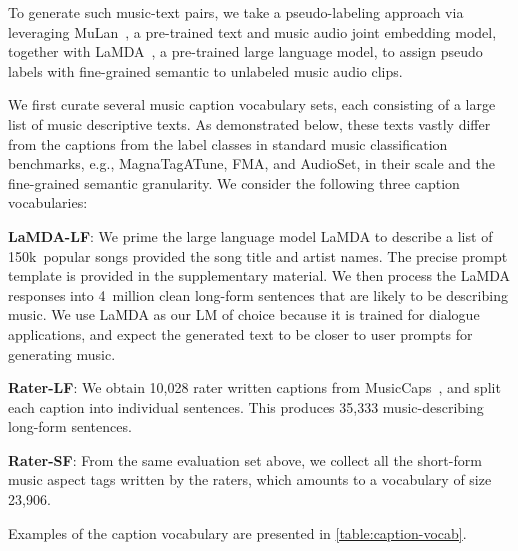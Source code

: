\documentclass[nohyperref]{article}
\newcommand{\EvalSet}{MusicCaps~\cite{musiclm2023}}
\theoremstyle{plain}
\theoremstyle{definition}
\theoremstyle{remark}
\begin{document}
To generate such music-text pairs, we take a pseudo-labeling approach via leveraging MuLan~\cite{mulan2022}, a pre-trained text and music audio joint embedding model, together with LaMDA~\cite{thoppilan2022lamda}, a pre-trained large language model, to assign pseudo labels with fine-grained semantic to unlabeled music audio clips.

We first curate several music caption vocabulary sets, each consisting of a large list of music descriptive texts. As demonstrated below, these texts vastly differ from the captions from the label classes in standard music classification benchmarks, e.g., MagnaTagATune, FMA, and AudioSet, in their scale and the fine-grained semantic granularity. We consider the following three caption vocabularies:

\textbf{LaMDA-LF}: We prime the large language model LaMDA to describe a list of 150k~popular songs provided the song title and artist names. The precise prompt template is provided in the supplementary material. We then process the LaMDA responses into 4~million clean long-form sentences that are likely to be describing music.
We use LaMDA as our LM of choice because it is trained for dialogue applications, and expect the generated text to be closer to user prompts for generating music. 

\textbf{Rater-LF}: We obtain 10,028 rater written captions from \EvalSet, and split each caption into individual sentences. This produces 35,333 music-describing long-form sentences.

\textbf{Rater-SF}: From the same evaluation set above, we collect all the short-form music aspect tags written by the raters, which amounts to a vocabulary of size 23,906.

Examples of the caption vocabulary are presented in \cref{table:caption-vocab}.
\end{document}

